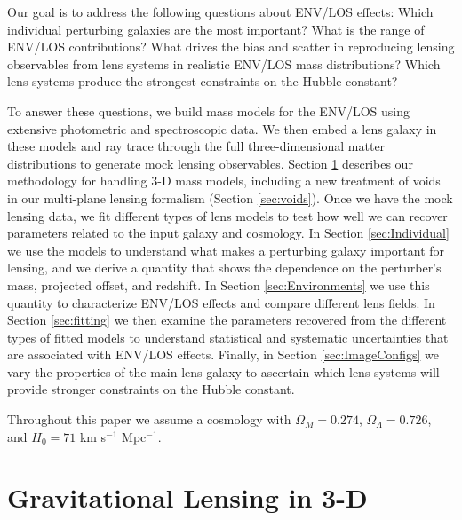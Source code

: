 \documentclass{emulateapj}
\begin{document}
Our goal is to address the following questions about ENV/LOS effects:
Which individual perturbing galaxies are the most important?
What is the range of ENV/LOS contributions?
What drives the bias and scatter in reproducing lensing observables from lens systems in realistic ENV/LOS mass distributions?
Which lens systems produce the strongest constraints on the Hubble constant?

To answer these questions, we build mass models for the ENV/LOS using extensive photometric and spectroscopic data. We then embed a lens galaxy in these models and ray trace through the full three-dimensional matter distributions to generate mock lensing observables. Section \ref{sec:3DMassModels} describes our methodology for handling 3-D mass models, including a new treatment of voids in our multi-plane lensing formalism (Section \ref{sec:voids}). Once we have the mock lensing data, we fit different types of lens models to test how well we can recover parameters related to the input galaxy and cosmology.  In Section \ref{sec:Individual} we use the models to understand what makes a perturbing galaxy important for lensing, and we derive a quantity that shows the dependence on the perturber's mass, projected offset, and redshift. In Section \ref{sec:Environments} we use this quantity to characterize ENV/LOS effects and compare different lens fields. In Section \ref{sec:fitting} we then examine the parameters recovered from the different types of fitted models to understand statistical and systematic uncertainties that are associated with ENV/LOS effects. Finally, in Section \ref{sec:ImageConfigs} we vary the properties of the main lens galaxy to ascertain which lens systems will provide stronger constraints on the Hubble constant.

Throughout this paper we assume a cosmology with $\Omega_M = 0.274$, $\Omega_\Lambda = 0.726$, and $H_0 = 71$ km s$^{-1}$ Mpc$^{-1}$.


\section{Gravitational Lensing in 3-D}
\label{sec:3DMassModels}
\end{document}
